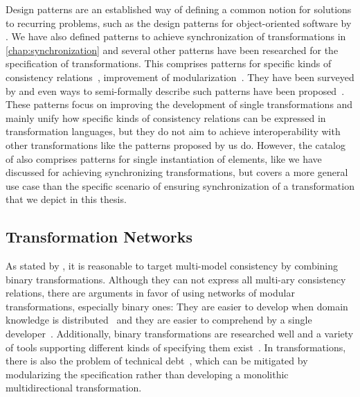Design patterns are an established way of defining a common notion for solutions to recurring problems, such as the design patterns for object-oriented software by \textcite{gamma1995designPatterns-Book}.
We have also defined patterns to achieve synchronization of transformations in \autoref{chap:synchronization} and several other patterns have been researched for the specification of transformations.
This comprises patterns for specific kinds of consistency relations~\cite{iacob2008a}, improvement of modularization~\cite{lano2014a}.
They have been surveyed by \textcite{lano2018a} and even ways to semi-formally describe such patterns have been proposed~\cite{huseyin2016patternsTransformations-CLSS}.
These patterns focus on improving the development of single transformations and mainly unify how specific kinds of consistency relations can be expressed in transformation languages, but they do not aim to achieve interoperability with other transformations like the patterns proposed by us do.
However, the catalog of \textcite{lano2014a} also comprises patterns for single instantiation of elements, like we have discussed for achieving synchronizing transformations, but covers a more general use case than the specific scenario of ensuring synchronization of a transformation that we depict in this thesis.


\subsection{Transformation Networks}

As stated by \textcite{stevens2020BidirectionalTransformationLarge-SoSym}, it is reasonable to target multi-model consistency by combining binary transformations.
Although they can not express all multi-ary consistency relations, there are arguments in favor of using networks of modular transformations, especially binary ones:
They are easier to develop when domain knowledge is distributed~\cite{klare2018docsym} and they are easier to comprehend by a single developer~\cite{cleve2019dagstuhl, stevens2020BidirectionalTransformationLarge-SoSym}.
Additionally, binary transformations are researched well and a variety of tools supporting different kinds of specifying them exist~\cite{stevens2008LandscapeBidirectionalTransformation-GTTSE, etzlstorfer2013SurveyIncrementalTransformation-ME, samimi-dehkordi2016iccke, macedo2017ModelRepairClassification-TSE}.
In transformations, there is also the problem of technical debt~\cite{lano2018technicalDebt-ICMT}, which can be mitigated by modularizing the specification rather than developing a monolithic multidirectional transformation.

